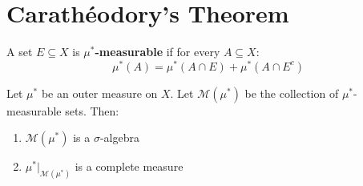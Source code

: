 \section{Carathéodory's Theorem}

\begin{definition}
A set $E \subseteq X$ is \textbf{$\mu^*$-measurable} if for every $A \subseteq X$:
\[ \mu^*(A) = \mu^*(A \cap E) + \mu^*(A \cap E^c) \]
\end{definition}

\begin{theorem}[Carathéodory]
Let $\mu^*$ be an outer measure on $X$. Let $\mathcal{M}(\mu^*)$ be the collection of $\mu^*$-measurable sets. Then:
\begin{enumerate}
    \item $\mathcal{M}(\mu^*)$ is a $\sigma$-algebra
    \item $\mu^*|_{\mathcal{M}(\mu^*)}$ is a complete measure
\end{enumerate}
\end{theorem}

